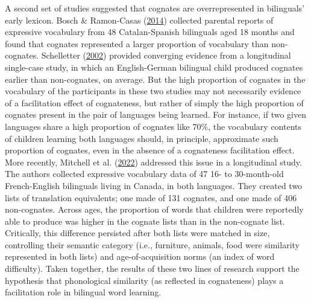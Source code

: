 \documentclass[
]{article}
\begin{document}
A second set of studies suggested that cognates are overrepresented in
bilinguals' early lexicon. Bosch \& Ramon-Casas
(\protect\hyperlink{ref-bosch2014first}{2014}) collected parental
reports of expressive vocabulary from 48 Catalan-Spanish bilinguals aged
18 months and found that cognates represented a larger proportion of
vocabulary than non-cognates. Schelletter
(\protect\hyperlink{ref-schelletter2002effect}{2002}) provided
converging evidence from a longitudinal single-case study, in which an
English-German bilingual child produced cognates earlier than
non-cognates, on average. But the high proportion of cognates in the
vocabulary of the participants in these two studies may not necessarily
evidence of a facilitation effect of cognateness, but rather of simply
the high proportion of cognates present in the pair of languages being
learned. For instance, if two given languages share a high proportion of
cognates like 70\%, the vocabulary contents of children learning both
languages should, in principle, approximate such proportion of cognates,
even in the absence of a cognateness facilitation effect. More recently,
Mitchell et al. (\protect\hyperlink{ref-mitchell2022cognates}{2022})
addressed this issue in a longitudinal study. The authors collected
expressive vocabulary data of 47 16- to 30-month-old French-English
bilinguals living in Canada, in both languages. They created two lists
of translation equivalents; one made of 131 cognates, and one made of
406 non-cognates. Across ages, the proportion of words that children
were reportedly able to produce was higher in the cognate lists than in
the non-cognate list. Critically, this difference persisted after both
lists were matched in size, controlling their semantic category (i.e.,
furniture, animals, food were similarity represented in both lists) and
age-of-acquisition norms (an index of word difficulty). Taken together,
the results of these two lines of research support the hypothesis that
phonological similarity (as reflected in cognateness) plays a
facilitation role in bilingual word learning.
\end{document}
